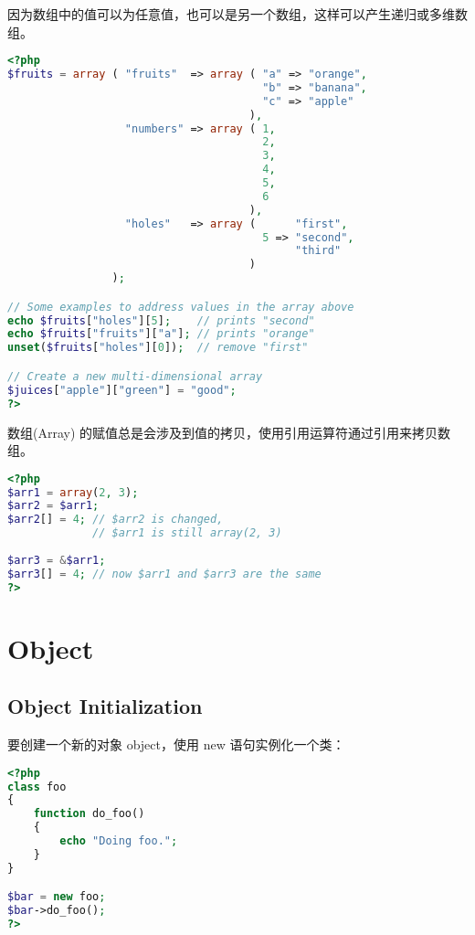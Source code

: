 因为数组中的值可以为任意值，也可以是另一个数组，这样可以产生递归或多维数组。



\begin{lstlisting}[language=PHP]
<?php
$fruits = array ( "fruits"  => array ( "a" => "orange",
                                       "b" => "banana",
                                       "c" => "apple"
                                     ),
                  "numbers" => array ( 1,
                                       2,
                                       3,
                                       4,
                                       5,
                                       6
                                     ),
                  "holes"   => array (      "first",
                                       5 => "second",
                                            "third"
                                     )
                );

// Some examples to address values in the array above 
echo $fruits["holes"][5];    // prints "second"
echo $fruits["fruits"]["a"]; // prints "orange"
unset($fruits["holes"][0]);  // remove "first"

// Create a new multi-dimensional array
$juices["apple"]["green"] = "good"; 
?>
\end{lstlisting}


数组(Array) 的赋值总是会涉及到值的拷贝，使用引用运算符通过引用来拷贝数组。


\begin{lstlisting}[language=PHP]
<?php
$arr1 = array(2, 3);
$arr2 = $arr1;
$arr2[] = 4; // $arr2 is changed,
             // $arr1 is still array(2, 3)
             
$arr3 = &$arr1;
$arr3[] = 4; // now $arr1 and $arr3 are the same
?>
\end{lstlisting}






\section{Object}

\subsection{Object Initialization}


要创建一个新的对象 object，使用 new 语句实例化一个类：

\begin{lstlisting}[language=PHP]
<?php
class foo
{
    function do_foo()
    {
        echo "Doing foo."; 
    }
}

$bar = new foo;
$bar->do_foo();
?>
\end{lstlisting}


